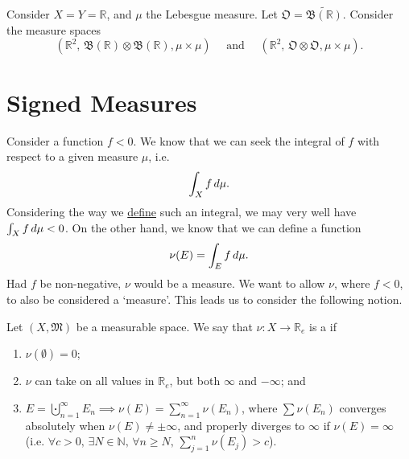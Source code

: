 \documentclass[notoc,notitlepage]{tufte-book}
\begin{document}
\begin{eg}

  Consider $X = Y = \mathbb{R}$, and $\mu$ the Lebesgue measure.
  Let $\mathfrak{O} = \widetilde{\mathfrak{B}(\mathbb{R})}$.
  Consider the measure spaces
  \begin{equation*}
    (\mathbb{R}^2,\, \mathfrak{B}(\mathbb{R}) \otimes \mathfrak{B}(\mathbb{R}),
    \mu \times \mu)
    \quad\text{ and }\quad
    (\mathbb{R}^2,\, \mathfrak{O} \otimes \mathfrak{O}, \mu \times \mu).
  \end{equation*}
\end{eg}


\section{Signed Measures}%
\label{sec:signed_measures}

Consider a function $f < 0$. We know that we can seek the
integral of $f$ with respect to a given measure $\mu$,
i.e.
\begin{equation*}
  \int_{X} f \mathop{}\!d{\mu}.
\end{equation*}
Considering the way we \hyperref[defn:integral_of_a_measurable_function]{define}
such an integral, we may very well have $\int_{X} f \mathop{}\!d{\mu} < 0$.
On the other hand, we know that we can define a function
\begin{equation*}
  \nu(E) = \int_{E} f \mathop{}\!d{\mu}.
\end{equation*}
Had $f$ be non-negative, $\nu$ would be a measure.
We want to allow $\nu$, where $f < 0$, to also be considered a `measure'.
This leads us to consider the following notion.

\begin{defn}\label{defn:signed_measure}
  Let $(X, \mathfrak{M})$ be a measurable space.
  We say that $\nu : X \to \mathbb{R}_e$ is a 
  if
  \begin{enumerate}
    \item $\nu(\emptyset) = 0$;
    \item $\nu$ can take on all values in $\mathbb{R}_e$,
      but  both $\infty$ and $-\infty$; and
    \item $E = \bigcupdot_{n=1}^{\infty} E_n \implies \nu(E) =
      \sum_{n=1}^{\infty} \nu(E_n)$,
      where $\sum \nu(E_n)$ converges absolutely when
      $\nu(E) \neq \pm \infty$,
      and properly diverges to $\infty$ if $\nu(E) = \infty$
      (i.e. $\forall c > 0,\, \exists N \in \mathbb{N},\, \forall n \geq
      N,\, \sum_{j=1}^{n} \nu(E_j) > c$).
  \end{enumerate}
\end{defn}
\end{document}
